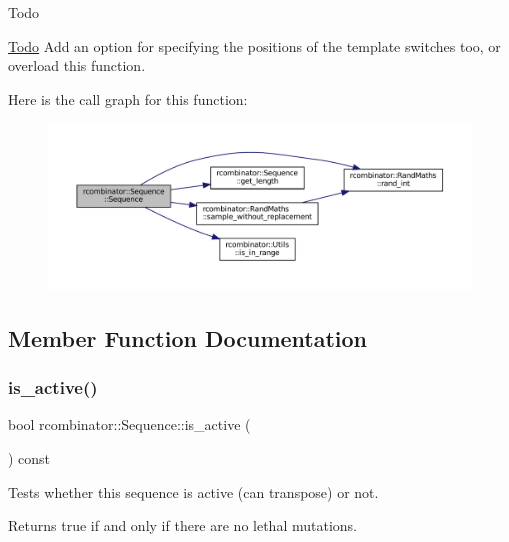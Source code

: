 \begin{DoxyRefDesc}{Todo}
\item[\mbox{\hyperlink{todo__todo000010}{Todo}}]Add an option for specifying the positions of the template switches too, or overload this function. \end{DoxyRefDesc}
Here is the call graph for this function\+:\nopagebreak
\begin{figure}[H]
\begin{center}
\leavevmode
\includegraphics[width=350pt]{classrcombinator_1_1Sequence_a976b331689ec55d9d306281bbff5d22d_cgraph}
\end{center}
\end{figure}


\subsection{Member Function Documentation}
\mbox{\label{classrcombinator_1_1Sequence_a5af66ddd3c8bc05307b56737c56060bf}} 
\subsubsection{\texorpdfstring{is\+\_\+active()}{is\_active()}}
{\footnotesize\ttfamily bool rcombinator\+::\+Sequence\+::is\+\_\+active (\begin{DoxyParamCaption}{ }\end{DoxyParamCaption}) const\hspace{0.3cm}{\ttfamily [inline]}}



Tests whether this sequence is active (can transpose) or not. 

Returns true if and only if there are no lethal mutations. \mbox{\label{classrcombinator_1_1Sequence_a5f7bccd4725bb8c46f6b93bd01a6b2f0}} 
